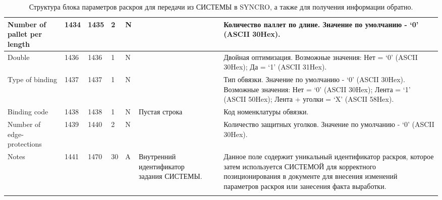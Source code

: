 \begin{landscape}
\begin{longtable}{|p{25mm}|p{6mm}|p{6mm}|p{8mm}|p{6mm}|p{60mm}|p{12mm}|p{100mm}|}
\hline
\parbox[c][8mm]{25mm}{Number of pallet per length} & \parbox{10mm}{1434} & \parbox{10mm}{1435} & \parbox{10mm}{2} & \parbox{10mm}{N} & \parbox{49mm}{} & \parbox{11mm}{} & \parbox{89mm}{Количество паллет по длине. Значение по умолчанию - ‘0’ (ASCII 30Hex).} \\
\hline
\parbox[c][10mm]{25mm}{Double} & \parbox{10mm}{1436} & \parbox{10mm}{1436} & \parbox{10mm}{1} & \parbox{10mm}{N} & \parbox{49mm}{} & \parbox{11mm}{} & \parbox{89mm}{Двойная оптимизация.
Возможные значения:
Нет = ‘0’ (ASCII 30Hex);
Да = ‘1’ (ASCII 31Hex).} \\
\hline
\parbox[c][22mm]{25mm}{Type of binding} & \parbox{10mm}{1437} & \parbox{10mm}{1437} & \parbox{10mm}{1} & \parbox{10mm}{N} & \parbox{49mm}{} & \parbox{11mm}{} & \parbox{89mm}{Тип обвязки. Значение по умолчанию - ‘0’ (ASCII 30Hex). Возможные значения: 
Нет = ‘0’ (ASCII 30Hex);
Лента = ‘1’ (ASCII 50Hex);
Лента + уголки = ‘X’ (ASCII 58Hex).} \\
\hline
\parbox[c][5mm]{25mm}{Binding code} & \parbox{10mm}{1438} & \parbox{10mm}{1438} & \parbox{10mm}{1} & \parbox{10mm}{N} & \parbox{49mm}{Пустая строка} & \parbox{11mm}{} & \parbox{89mm}{Код номенклатуры обвязки.} \\
\hline
\parbox[c][8mm]{25mm}{Number of edge-protections} & \parbox{10mm}{1439} & \parbox{10mm}{1440} & \parbox{10mm}{2} & \parbox{10mm}{N} & \parbox{49mm}{} & \parbox{11mm}{} & \parbox{89mm}{Количество защитных уголков. Значение по умолчанию - ‘0’ (ASCII 30Hex).} \\
\hline
\parbox[c][20mm]{25mm}{Notes} & \parbox{10mm}{1441} & \parbox{10mm}{1470} & \parbox{10mm}{30} & \parbox{10mm}{A} & \parbox{49mm}{Внутренний идентификатор задания СИСТЕМЫ.} & \parbox{11mm}{} & \parbox{89mm}{Данное поле содержит уникальный идентификатор раскроя, которое затем используется СИСТЕМОЙ для корректного позиционирования в документе для внесения изменений параметров раскроя или занесения факта выработки.} \\
\hline
\caption{Структура блока параметров раскроя для передачи из СИСТЕМЫ в SYNCRO, а также для получения информации обратно.}\label{tab:fosber_block}
\end{longtable}

\end{landscape} 

\normalsize



